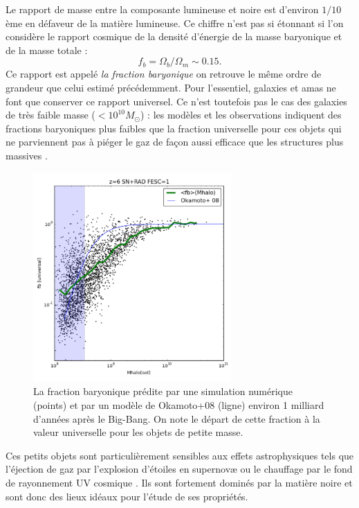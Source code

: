 Le rapport de masse entre la composante lumineuse et noire est d'environ $1/10$ème en défaveur de la matière lumineuse. Ce chiffre n'est pas si étonnant si l'on considère le rapport cosmique de la densité d'énergie de la masse baryonique et de la masse totale :
\begin{equation}
f_b=\Omega_b/\Omega_m\sim0.15.
\end{equation}
Ce rapport est appelé \textit{la fraction baryonique} on retrouve le même ordre de grandeur que celui estimé précédemment. Pour l'essentiel, galaxies et amas ne font que conserver ce rapport universel. Ce n'est toutefois pas le cas des galaxies de très faible masse ($<10^{10} M_\odot$) : les modèles et les observations indiquent des fractions baryoniques plus faibles que la fraction universelle pour ces objets qui ne parviennent pas à piéger le gaz de façon aussi efficace que les structures plus massives . 
\begin{figure}[htbp]
	\centering
		\includegraphics[height=8cm]{figs/fbar.png}
	\caption[La fraction baryonique prédite par une simulation numérique]{La fraction baryonique prédite par une simulation numérique (points) et par un modèle de Okamoto+08 (ligne) environ 1 milliard d'années après le Big-Bang. On note le départ de cette fraction à la valeur universelle pour les objets de petite masse.} 
	\label{f:fbar}
\end{figure}
Ces petits objets sont particulièrement sensibles aux effets astrophysiques tels que l'éjection de gaz par l'explosion d'étoiles en supernovæ ou le chauffage par le fond de rayonnement UV cosmique . Ils sont fortement dominés par la matière noire et sont donc des lieux idéaux pour l'étude de ses propriétés.

